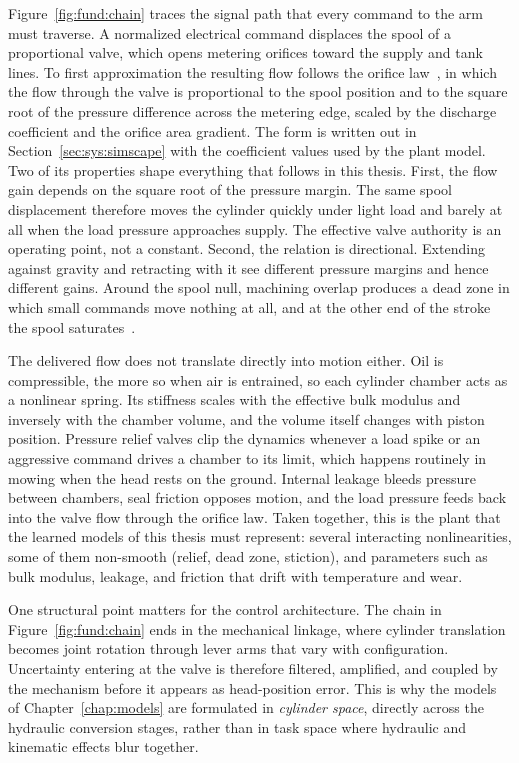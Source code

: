 Figure~\ref{fig:fund:chain} traces the signal path that every command to
the arm must traverse. A normalized electrical command displaces the
spool of a proportional valve, which opens metering orifices toward the
supply and tank lines. To first approximation the resulting flow follows the orifice
law~\cite{merritt1967hydraulic}, in which the flow through the valve is
proportional to the spool position and to the square root of the pressure
difference across the metering edge, scaled by the discharge coefficient and
the orifice area gradient. The form is written out in
Section~\ref{sec:sys:simscape} with the coefficient values used by the plant
model. Two of its properties shape everything that follows in this thesis.
First, the flow gain depends on the square root of the pressure margin. The same spool
displacement therefore moves the cylinder quickly under light load and
barely at all when the load pressure approaches supply. The effective
valve authority is an operating point, not a constant. Second, the
relation is directional. Extending against gravity and retracting with it
see different pressure margins and hence different gains. Around the
spool null, machining overlap produces a dead zone in which small
commands move nothing at all, and at the other end of the stroke the
spool saturates~\cite{jelali2003hydraulic}.

The delivered flow does not translate directly into motion either. Oil
is compressible, the more so when air is entrained, so each cylinder
chamber acts as a nonlinear spring. Its stiffness scales with the
effective bulk modulus and inversely with the chamber volume, and the
volume itself changes with piston position. Pressure relief valves clip
the dynamics whenever a load spike or an aggressive command drives a
chamber to its limit, which happens routinely in mowing when the head
rests on the ground. Internal leakage bleeds pressure between chambers,
seal friction opposes motion, and the load pressure feeds back into the
valve flow through the orifice law. Taken together, this is the
plant that the learned models of this thesis must represent: several
interacting nonlinearities, some of them non-smooth (relief, dead zone,
stiction), and parameters such as bulk modulus, leakage, and friction
that drift with temperature and wear.

One structural point matters for the control architecture. The chain in
Figure~\ref{fig:fund:chain} ends in the mechanical linkage, where
cylinder translation becomes joint rotation through lever arms that vary
with configuration. Uncertainty entering at the valve is therefore
filtered, amplified, and coupled by the mechanism before it appears as
head-position error. This is why the models of Chapter~\ref{chap:models}
are formulated in \emph{cylinder space}, directly across the hydraulic
conversion stages, rather than in task space where hydraulic and
kinematic effects blur together.

